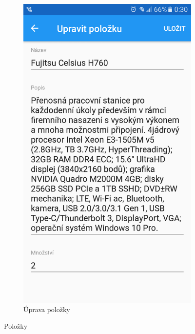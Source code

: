 \documentclass[12pt]{report}
\begin{document}
\begin{figure}[H]
\begin{subfigure}[b]{0.3\textwidth}
    \centering
	\includegraphics[width=\textwidth]{../images/client_android/Screenshot_20170612-003030.png}	
	\caption{Úprava položky}
	\label{fig:Screenshot_20170612-003030}
  \end{subfigure}
  \caption{Položky}
\end{figure}
\end{document}
